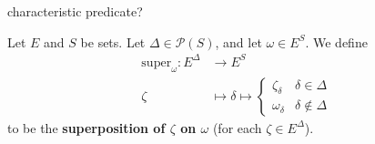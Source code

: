 \begin{definition}
   \label{def:product-probability-measure}
   characteristic predicate?
\end{definition}

\begin{definition}[Superposition]
    \label{def:superposition}
    \leanok
    Let $E$ and $S$ be sets. Let $\Delta\in\mathcal{P}(S)$, and let $\omega\in E^S$. We define
    \begin{align*}
        \text{super}_\omega:E^\Delta&\to E^S\\
        \zeta&\mapsto \delta\mapsto\begin{cases}
            \zeta_\delta & \delta\in\Delta\\
            \omega_\delta & \delta\notin\Delta
        \end{cases}
    \end{align*}
    to be the \textbf{superposition of $\zeta$ on $\omega$} (for each $\zeta\in E^\Delta$).
\end{definition}
